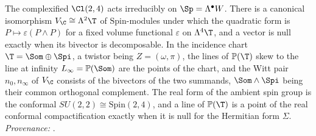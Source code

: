 The complexified $\Cl(2,4)$ acts irreducibly on $\Sp = \Lambda^{\bullet}W$. There is a canonical isomorphism $V_{\C} \cong \Lambda^{2}\T$ of $\mathrm{Spin}$-modules under which the quadratic form is $P \mapsto \varepsilon(P \wedge P)$ for a fixed volume functional $\varepsilon$ on $\Lambda^{4}\T$, and a vector is null exactly when its bivector is decomposable. In the incidence chart $\T = \Som \oplus \Spi$, a twistor being $Z = (\omega, \pi)$, the lines of $\mathbb{P}(\T)$ skew to the line at infinity $L_{\infty} = \mathbb{P}(\Som)$ are the points of the chart, and the Witt pair $n_{0}, n_{\infty}$ of $V_{\C}$ consists of the bivectors of the two summands, $\Som \wedge \Spi$ being their common orthogonal complement. The real form of the ambient spin group is the conformal $SU(2,2) \cong \mathrm{Spin}(2,4)$, and a line of $\mathbb{P}(\T)$ is a point of the real conformal compactification exactly when it is null for the Hermitian form $\Sigma$. \emph{Provenance:} \cite[Rem.~3.2, Thms.~3.1, 3.4, 4.2, Props.~4.1, 4.5]{ButlerT9}.
